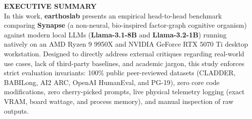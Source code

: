\documentclass[11pt,a4paper]{article}
\begin{document}
\begin{abstractbox}
  \noindent\textbf{\textsf{\color{brandnavy}EXECUTIVE SUMMARY}}\\[0.3em]
  \footnotesize\noindent In this work, \textbf{earthoslab} presents an empirical head-to-head benchmark comparing \textbf{Synapse} (a non-neural, bio-inspired factor-graph cognitive organism) against modern local LLMs (\textbf{Llama-3.1-8B} and \textbf{Llama-3.2-1B}) running natively on an AMD Ryzen 9 9950X and NVIDIA GeForce RTX 5070 Ti desktop workstation. Designed to directly address external critiques regarding real-world use cases, lack of third-party baselines, and academic jargon, this study enforces strict evaluation invariants: 100\% public peer-reviewed datasets (CLADDER, BABILong, AI2 ARC, OpenAI HumanEval, and PG-19), zero core code modifications, zero cherry-picked prompts, live physical telemetry logging (exact VRAM, board wattage, and process memory), and manual inspection of raw outputs. 


\end{abstractbox}
\end{document}

